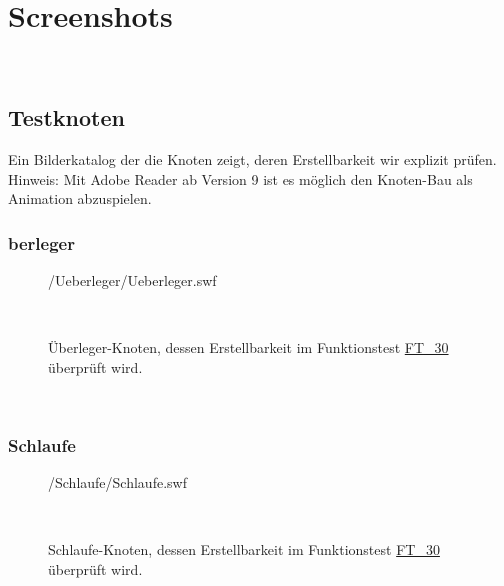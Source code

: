 %



\section{Screenshots}
\label{Anhang:Aufnahmen}


~\\



\newpage




\subsection{Testknoten}

Ein Bilderkatalog der die Knoten zeigt, deren Erstellbarkeit wir explizit prüfen. Hinweis: Mit Adobe Reader ab Version 9 ist es möglich den Knoten-Bau als Animation abzuspielen.\\


	\subsubsection*{berleger\grqq}
	
	
		\begin{figure}[!h]
		
			\label{Abb:Test-Bau-Knoten:Ueberleger}
			\centering	
			
			{\testknots/Ueberleger/Ueberleger.swf}
			
			~\\
	
			\caption{Überleger-Knoten, dessen Erstellbarkeit im Funktionstest \hyperref[FT:30:Ueberleger]{FT\_30} überprüft wird. }
	
		\end{figure}
		
		~\\
	
	
\clearpage	


	\subsubsection*{\glqq Schlaufe\grqq}	
	
		\begin{figure}[!h]
		
			\label{Abb:Test-Bau-Knoten:Schlaufe}
			\centering	
			
			{\testknots/Schlaufe/Schlaufe.swf}
			
			~\\
	
			\caption{Schlaufe-Knoten, dessen Erstellbarkeit im Funktionstest \hyperref[FT:30:Schlaufe]{FT\_30} überprüft wird. }
	
		\end{figure}
		
